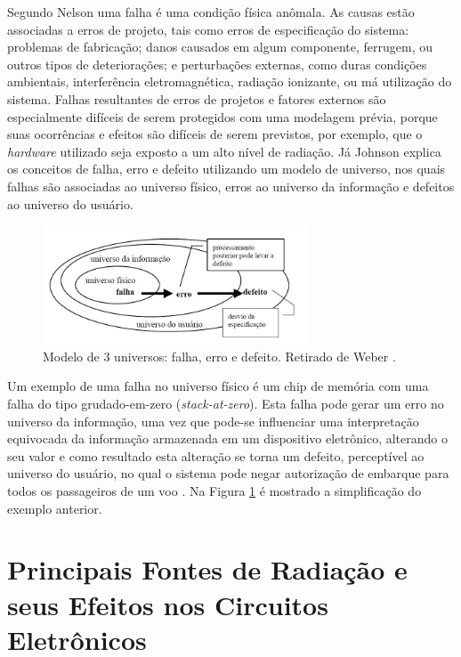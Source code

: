 Segundo Nelson \cite{Nelson:1990} uma falha é uma condição física anômala. As causas estão associadas a erros de projeto, tais como erros de especificação do sistema: problemas de fabricação; danos causados em algum componente, ferrugem, ou outros tipos de deteriorações; e perturbações externas, como duras condições ambientais, interferência eletromagnética, radiação ionizante, ou má utilização do sistema. Falhas resultantes de erros de projetos e fatores externos são especialmente difíceis de serem protegidos com uma modelagem prévia, porque suas ocorrências e efeitos são difíceis de serem previstos, por exemplo, que o \textit{hardware} utilizado seja exposto a um alto nível de radiação. Já Johnson \cite{Johnson:1984} explica os conceitos de falha, erro e defeito utilizando um modelo de universo, nos quais falhas são associadas ao universo físico, erros ao universo da informação e defeitos ao universo do usuário. 

\begin{figure}[H]
	\centering
	\includegraphics[width=0.7\textwidth]{figuras/modeloUniverso.jpg}
	\caption[Modelo de três universos]{Modelo de 3 universos: falha, erro e defeito. Retirado de Weber \cite{Weber:2002}.}
	\label{Img:modeloUniverso}	
\end{figure}

Um exemplo de uma falha no universo físico é um chip de memória com uma falha do tipo grudado-em-zero (\textit{stack-at-zero}). Esta falha pode gerar um erro no universo da informação, uma vez que pode-se influenciar uma interpretação equivocada da informação armazenada em um dispositivo eletrônico, alterando o seu valor e como resultado esta alteração se torna um defeito, perceptível ao universo do usuário, no qual o sistema pode negar autorização de embarque para todos os passageiros de um voo \cite{Nelson:1990}. Na Figura \ref{Img:modeloUniverso} é mostrado a simplificação do exemplo anterior.

\section{Principais Fontes de Radiação e seus Efeitos nos Circuitos Eletrônicos} \label{sec:radiacao}

